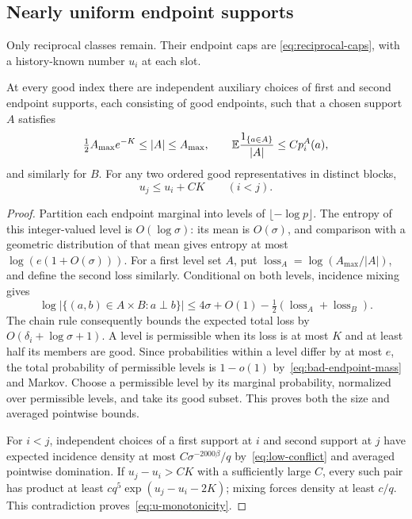 \subsection{Nearly uniform endpoint supports}

Only reciprocal classes remain.  Their endpoint caps are
\eqref{eq:reciprocal-caps}, with a history-known number $u_i$ at each
slot.

\begin{lemma}\label{lem:flat-levels}
At every good index there are independent auxiliary choices of first
and second endpoint supports, each consisting of good endpoints, such
that a chosen support $A$ satisfies
\[
 \tfrac12 A_{\max}e^{-K}\le |A|\le A_{\max},
 \qquad \mathbb E\frac{1_{\{a\in A\}}}{|A|}\le C p_i^A(a),
\]
and similarly for $B$.  For any two ordered good representatives in
distinct blocks,
\begin{equation}\label{eq:u-monotonicity}
 u_j\le u_i+CK\qquad(i<j).
\end{equation}
\end{lemma}

\begin{proof}
Partition each endpoint marginal into levels of
$\lfloor-\log p\rfloor$.  The entropy of this integer-valued level is
$O(\log\sigma)$: its mean is $O(\sigma)$, and comparison with a geometric
distribution of that mean gives entropy at most
$\log(e(1+O(\sigma)))$.
For a first level set $A$, put
$\operatorname{loss}_A=\log(A_{\max}/|A|)$, and define the second loss
similarly.  Conditional on both levels, incidence mixing gives
\[
 \log|\{(a,b)\in A\times B:a\perp b\}|
 \le4\sigma+O(1)
       -\tfrac12(\operatorname{loss}_A+\operatorname{loss}_B).
\]
The chain rule consequently bounds the expected total loss by
$O(\delta_i+\log\sigma+1)$.  A level is permissible when its loss is
at most $K$ and at least half its members are good.  Since probabilities
within a level differ by at most $e$, the total probability of permissible
levels is $1-o(1)$ by~\eqref{eq:bad-endpoint-mass} and Markov.
Choose a permissible level by its marginal probability, normalized over
permissible levels, and take its good subset.  This proves both the size
and averaged pointwise bounds.

For $i<j$, independent choices of a first support at $i$ and second
support at $j$ have expected incidence density at most
$C\sigma^{-2000\beta}/q$ by~\eqref{eq:low-conflict} and averaged
pointwise domination.  If $u_j-u_i>CK$ with a sufficiently large $C$,
every such pair has product at least
$c q^5\exp(u_j-u_i-2K)$; mixing forces density at least $c/q$.
This contradiction proves~\eqref{eq:u-monotonicity}.
\end{proof}

